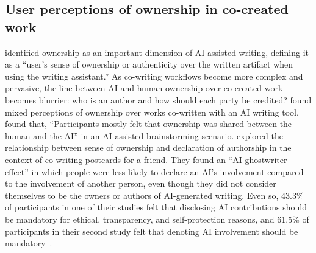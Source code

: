 \subsection{User perceptions of ownership in co-created work}
\label{sec:related-work-perceptions}

\citet{lee2024design} identified ownership as an important dimension of AI-assisted writing, defining it as a ``user’s sense of ownership or authenticity over the written artifact when using the writing assistant.'' As co-writing workflows become more complex and pervasive, the line between AI and human ownership over co-created work becomes blurrier: who is an author and how should each party be credited? \citet{yeh2024ghostwriter} found mixed perceptions of ownership over works co-written with an AI writing tool. \citet{he2024ai} found that, ``Participants mostly felt that ownership was shared between the human and the AI'' in an AI-assisted brainstorming scenario. \citet{draxler2024ai} explored the relationship between sense of ownership and declaration of authorship in the context of co-writing postcards for a friend. They found an ``AI ghostwriter effect'' in which people were less likely to declare an AI's involvement compared to the involvement of another person, even though they did not consider themselves to be the owners or authors of AI-generated writing. Even so, 43.3\% of participants in one of their studies felt that disclosing AI contributions should be mandatory for ethical, transparency, and self-protection reasons, and 61.5\% of participants in their second study felt that denoting AI involvement should be mandatory~\cite{draxler2024ai}.

